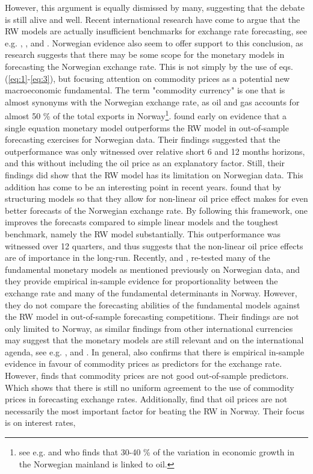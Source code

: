 \documentclass[10pt]{article}
\numberwithin{equation}{section}
\numberwithin{table}{section}
\numberwithin{figure}{section}
\begin{document}
\begin{spacing}{1.5}
\indent However, this argument is equally dismissed by many, suggesting that the debate is still alive and well. Recent international research have come to argue that the RW models are actually insufficient benchmarks for exchange rate forecasting, see e.g. \cite{wu2001real}, \cite{alvarez2007if}, \cite{bissoondeeal2009monetary} and \cite{Retief2015}. Norwegian evidence also seem to offer support to this conclusion, as research suggests that there may be some scope for the monetary models in forecasting the Norwegian exchange rate. This is not simply by the use of eqs. (\ref{eq:1}-\ref{eq:3}), but focusing attention on commodity prices as a potential new macroeconomic fundamental. The term "commodity currency" is one that is almost synonyms with the Norwegian exchange rate, as oil and gas accounts for almost 50 \% of the total exports in Norway\footnote{see e.g. \cite{SSB1} and \cite{bjornland2013} who finds that 30-40 \% of the variation in economic growth in the Norwegian mainland is linked to oil.}. \cite{reinton1999out} found early on evidence that a single equation monetary model outperforms the RW model in out-of-sample forecasting exercises for Norwegian data. Their findings suggested that the outperformance was only witnessed over relative short 6 and 12 months horizons, and this without including the oil price as an explanatory factor. Still, their findings did show that the RW model has its limitation on Norwegian data. This addition has come to be an interesting point in recent years. \cite{akram2000does, akram2004oil} found that by structuring models so that they allow for non-linear oil price effect makes for even better forecasts of the Norwegian exchange rate. By following this framework, one improves the forecasts compared to simple linear models and the toughest benchmark, namely the RW model substantially. This outperformance was witnessed over 12 quarters, and thus suggests that the non-linear oil price effects are of importance in the long-run. Recently, \cite{papadamou2012monetary} and \cite{papadimitriou2014forecasting}, re-tested many of the fundamental monetary models as mentioned previously on Norwegian data, and they provide empirical in-sample evidence for proportionality between the exchange rate and many of the fundamental determinants in Norway. However, they do not compare the forecasting abilities of the fundamental models against the RW model in out-of-sample forecasting competitions. Their findings are not only limited to Norway, as similar findings from other international currencies may suggest that the monetary models are still relevant and on the international agenda, see e.g. \cite{chin2007monetaryb, chin2007monetary}, \cite{tawadros2008structural} and \cite{loria2010new}. In general, \cite{chen2003commodity} also confirms that there is empirical in-sample evidence in favour of commodity prices as predictors for the exchange rate. However, \cite{chen2010predicting} finds that commodity prices are not good out-of-sample predictors. Which shows that there is still no uniform agreement to the use of commodity prices in forecasting exchange rates. Additionally, \cite{bjornland2006importance} find that oil prices are not necessarily the most important factor for beating the RW in Norway. Their focus is on interest rates, 
\end{spacing}
\end{document}
